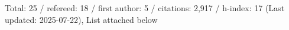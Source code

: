 Total: 25 / refereed: 18 / first author: 5 / citations: 2,917 / h-index: 17 (Last updated: 2025-07-22), List attached below